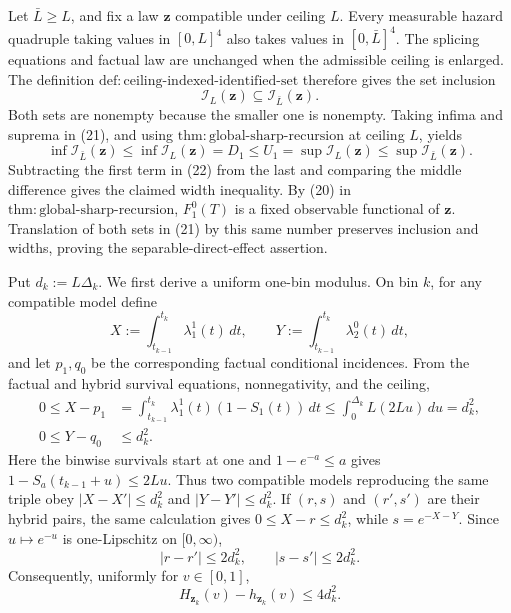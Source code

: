 Let \(\bar L\ge L\), and fix a law \(\mathbf z\) compatible under ceiling \(L\).  Every measurable hazard quadruple taking values in \([0,L]^4\) also takes values in \([0,\bar L]^4\).  The splicing equations and factual law are unchanged when the admissible ceiling is enlarged.  The definition \(\mathrm{def{:}ceiling\text{-}indexed\text{-}identified\text{-}set}\) therefore gives the set inclusion
\[
 \mathcal I_L(\mathbf z)\subseteq\mathcal I_{\bar L}(\mathbf z).  \tag{21}
\]
Both sets are nonempty because the smaller one is nonempty.  Taking infima and suprema in (21), and using \(\mathrm{thm{:}global\text{-}sharp\text{-}recursion}\) at ceiling \(L\), yields
\[
 \inf\mathcal I_{\bar L}(\mathbf z)
 \le \inf\mathcal I_L(\mathbf z)=D_1
 \le U_1=\sup\mathcal I_L(\mathbf z)
 \le \sup\mathcal I_{\bar L}(\mathbf z).                  \tag{22}
\]
Subtracting the first term in (22) from the last and comparing the middle difference gives the claimed width inequality.  By (20) in \(\mathrm{thm{:}global\text{-}sharp\text{-}recursion}\), \(F_1^0(T)\) is a fixed observable functional of \(\mathbf z\).  Translation of both sets in (21) by this same number preserves inclusion and widths, proving the separable-direct-effect assertion.

Put \(d_k:=L\Delta_k\).  We first derive a uniform one-bin modulus.  On bin \(k\), for any compatible model define
\[
 X:=\int_{t_{k-1}}^{t_k}\lambda_1^1(t)\,dt,
 \quad\quad Y:=\int_{t_{k-1}}^{t_k}\lambda_2^0(t)\,dt,
\]
and let \(p_1,q_0\) be the corresponding factual conditional incidences.  From the factual and hybrid survival equations, nonnegativity, and the ceiling,
\[
\begin{aligned}
 0\le X-p_1
 &=\int_{t_{k-1}}^{t_k}\lambda_1^1(t)(1-S_1(t))\,dt
 \le\int_0^{\Delta_k}L(2Lu)\,du=d_k^2,\\
 0\le Y-q_0&\le d_k^2.
\end{aligned}                                                \tag{23}
\]
Here the binwise survivals start at one and \(1-e^{-a}\le a\) gives \(1-S_a(t_{k-1}+u)\le2Lu\).  Thus two compatible models reproducing the same triple obey \(|X-X'|\le d_k^2\) and \(|Y-Y'|\le d_k^2\).  If \((r,s)\) and \((r',s')\) are their hybrid pairs, the same calculation gives \(0\le X-r\le d_k^2\), while \(s=e^{-X-Y}\).  Since \(u\mapsto e^{-u}\) is one-Lipschitz on \([0,\infty)\),
\[
 |r-r'|\le2d_k^2,\quad\quad |s-s'|\le2d_k^2.                    \tag{24}
\]
Consequently, uniformly for \(v\in[0,1]\),
\[
 H_{\mathbf z_k}(v)-h_{\mathbf z_k}(v)\le4d_k^2.           \tag{25}
\]

